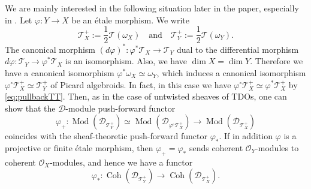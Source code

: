 \documentclass[11pt, a4paper]{amsart}
\newcommand{\sD}{\mathscr{D}}
\DeclareMathOperator{\Mod}{Mod}
\DeclareMathOperator{\Coh}{Coh}
\newcommand{\smallhalf}{{\scriptscriptstyle 1/2}}
\newcommand{\T}{\mathcal{T}}
\newcommand{\TT}{\mathscr{T}}
\newcommand{\PicAlg}{\mathscr{PA}}
\newcommand{\OO}{\mathcal{O}}
\theoremstyle{definition}
\numberwithin{equation}{section}
\begin{document}
We are mainly interested in the following situation later in the paper, especially in . Let $\varphi: Y \to X$ be an \'{e}tale morphism. We write 
	\[ \TT^+_X := \frac{1}{2} \TT(\omega_X) \quad \text{and} \quad \TT^+_Y := \frac{1}{2} \TT(\omega_Y). \]
The canonical morphism $(d\varphi)^*: \varphi^*\T_X \to \T_Y$ dual to the differential morphism $d\varphi: \T_Y \to \varphi^*\T_X$ is an isomorphism. Also, we have $\dim X = \dim Y$. Therefore we have a canonical isomorphism $\varphi^*\omega_X \simeq \omega_Y$, which induces a canonical isomorphism $\varphi^\circ \TT^+_X \simeq \TT^+_Y$ of Picard algebroids. In fact, in this case we have $\varphi^\circ \TT^+_X \simeq \varphi^*\TT^+_X$ by \eqref{eq:pullbackTT}. Then, as in the case of untwisted sheaves of TDOs, one can show that the $\sD$-module push-forward functor 
\[
	\varphi_+: \Mod(\sD_{\TT^+_Y}) \simeq \Mod(\sD_{\varphi^\circ \TT^+_X}) \to \Mod(\sD_{\TT^+_X})
\] 
coincides with the sheaf-theoretic push-forward functor $\varphi_*$. If in addition $\varphi$ is a projective or finite \'{e}tale morphism, then $\varphi_+ = \varphi_*$ sends coherent $\OO_Y$-modules to coherent $\OO_X$-modules, and hence we have a functor
\[
	\varphi_*: \Coh(\sD_{\TT^+_Y}) \to \Coh(\sD_{\TT^+_X}).
\]

\end{document}
